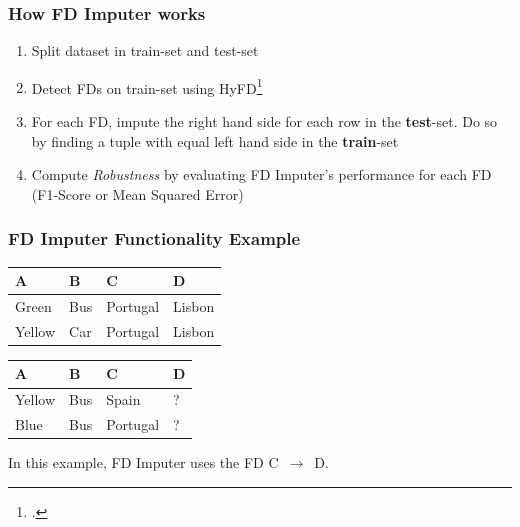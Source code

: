 \documentclass{beamer}
\begin{document}
\begin{frame}
    \frametitle{How FD Imputer works}
    \begin{enumerate}
        \item Split dataset in train-set and test-set
        \item Detect FDs on train-set using HyFD\footcite{PAP16}
        \item For each FD, impute the right hand side for each row in the \textbf{test}-set. Do so by finding a tuple with equal left hand side in the \textbf{train}-set
        \item Compute \emph{Robustness} by evaluating FD Imputer's performance for each FD (F1-Score or Mean Squared Error)
    \end{enumerate}
\end{frame}

\begin{frame}
    \frametitle{FD Imputer Functionality Example}
\begin{table}[ht]
    \begin{subtable}[c]{0.9\textwidth}
        \centering
        \begin{tabular}{llll}
            \textsc{A} & \textsc{B} & \textsc{C} & \textsc{D}  \\
        \toprule
        \toprule
            Green & Bus & Portugal & Lisbon \\
            Yellow & Car & Portugal & Lisbon \\
        \bottomrule
        \bottomrule
        \end{tabular}
    \end{subtable}
    \newline
    \vspace*{0.3 cm}
    \newline
\begin{subtable}[c]{0.9\textwidth}
        \centering
        \begin{tabular}{llll}
        \textsc{A} & \textsc{B} & \textsc{C} & \textsc{D} \\
        \toprule
        \toprule
        Yellow & Bus & Spain & ? \\
        Blue & Bus & Portugal & ? \\
        \bottomrule
        \bottomrule
        \end{tabular}
    \end{subtable}
\end{table}
In this example, FD Imputer uses the FD \textsc{C}~$\rightarrow$~\textsc{D}.
\end{frame}
\end{document}
